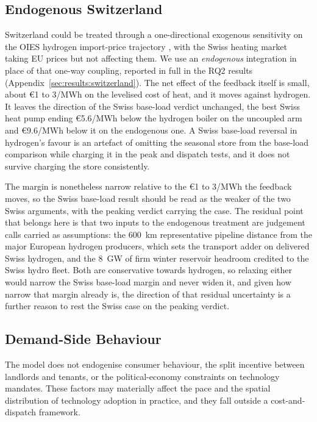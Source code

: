 \subsection{Endogenous Switzerland}
Switzerland could be treated through a one-directional exogenous sensitivity
on the OIES hydrogen import-price trajectory \citep{OIES2024hydrogenimportsET32,
Alsulaiman2023ET24}, with the Swiss heating market taking EU prices but not affecting
them. We use an \emph{endogenous} integration in place of that one-way coupling,
reported in full in the RQ2 results (Appendix~\ref{sec:results:switzerland}). The net
effect of the feedback itself is small, about \euro{}1 to 3/MWh on the levelised cost of
heat, and it moves against hydrogen. It leaves the direction of the Swiss base-load
verdict unchanged, the best Swiss heat pump ending \euro{}5.6/MWh below the hydrogen
boiler on the uncoupled arm and \euro{}9.6/MWh below it on the endogenous one. A Swiss base-load reversal in hydrogen's
favour is an artefact of omitting the seasonal store from the base-load
comparison while charging it in the peak and dispatch tests, and it does not survive
charging the store consistently.

The margin is nonetheless narrow relative to the \euro{}1 to 3/MWh the feedback moves,
so the Swiss base-load result should be read as the weaker of the two Swiss arguments,
with the peaking verdict carrying the case. The residual point that belongs here is that
two inputs to the endogenous treatment are judgement calls carried as assumptions: the
600~km representative pipeline distance from the major European hydrogen producers,
which sets the transport adder on delivered Swiss hydrogen, and the 8~GW of firm winter
reservoir headroom credited to the Swiss hydro fleet. Both are conservative towards
hydrogen, so relaxing either would narrow the Swiss base-load margin and never widen it,
and given how narrow that margin already is, the direction of that residual uncertainty
is a further reason to rest the Swiss case on the peaking verdict.

\subsection{Demand-Side Behaviour}
The model does not endogenise consumer behaviour, the split incentive between
landlords and tenants, or the political-economy constraints on technology
mandates. These factors may materially affect the pace and the spatial
distribution of technology adoption in practice, and they fall outside a
cost-and-dispatch framework.

